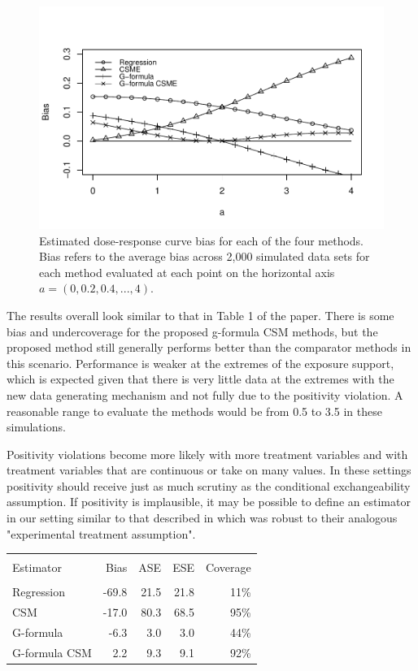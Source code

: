 \documentclass[12pt]{article}
\newcounter{tblcap}
\def\tblhead#1{\hline\\[-9pt]#1\\\hline\\[-9.75pt]}
\def\lastline{\\\hline}
\begin{document}
\begin{figure}
\centering
\includegraphics[width=6in]{app_fig2.pdf}
\caption{Estimated dose-response curve bias for each of the four methods. Bias refers to the average bias across 2,000 simulated data sets for each method evaluated at each point on the horizontal axis $a = (0, 0.2, 0.4, ..., 4)$.}
\end{figure}

The results overall look similar to that in Table 1 of the paper. There is some bias and undercoverage for the proposed g-formula CSM methods, but the proposed method still generally performs better than the comparator methods in this scenario. Performance is weaker at the extremes of the exposure support, which is expected given that there is very little data at the extremes with the new data generating mechanism and not fully due to the positivity violation. A reasonable range to evaluate the methods would be from 0.5 to 3.5 in these simulations.

Positivity violations become more likely with more treatment variables and with treatment variables that are continuous or take on many values. In these settings positivity should receive just as much scrutiny as the conditional exchangeability assumption. If positivity is implausible, it may be possible to define an estimator in our setting similar to that described in \citet{neugebauer2005} which was robust to their analogous "experimental treatment assumption".

\begin{table}[h]
{\tabcolsep=4.25pt
\begin{tabular}{@{}lrrrr@{}}
\tblhead{Estimator & Bias & ASE & ESE & Coverage}
Regression & -69.8 & 21.5 & 21.8 & 11\% \\
CSM & -17.0 & 80.3 & 68.5 & 95\% \\
G-formula & -6.3 & 3.0 & 3.0 & 44\% \\
G-formula CSM & 2.2 & 9.3 & 9.1 & 92\%
\lastline
\end{tabular}}
\end{table}
\end{document}
